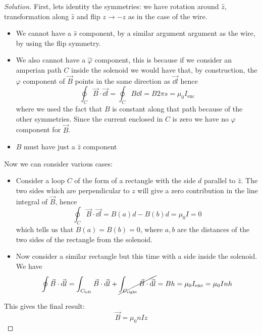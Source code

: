 \documentclass[12pt]{extarticle}
\begin{document}
\begin{proof}[Solution]
    First, lets identity the symmetries:
    we have rotation around $\hat z$, transformation along $\hat z$ and flip $z \to -z$ as in the case of the wire.

    \begin{itemize}
        \item We cannot have a $\hat s$ component, by a similar argument argument as the wire, by using the flip symmetry.
        \item We also cannot have a $\hat \varphi$ component, this is because if we consider an amperian path $C$
              inside the solenoid we would have that, by construction, the $\varphi$ component of $\vec B$ points in the same direction
              as $\vec{\dd l}$ hence
              \begin{equation}
                  \oint_C \vec B \cdot \vec{\dd l} = \oint_C B \dd{l} = B 2\pi s = \mu_0 I_\text{enc}
              \end{equation}
              where we used the fact that $B$ is constant along that path because of the other symmetries.
              Since the current enclosed in $C$ is zero we have no $\varphi$ component for $\vec B$.
        \item $B$ must have just a $\hat z$ component
    \end{itemize}

    Now we can consider various cases:
    \begin{itemize}
        \item Consider a loop $C$ of the form of a rectangle with the side $d$ parallel to $\hat z$.
              The two sides which are perpendicular to $z$ will give a zero contribution in the line integral of $\vec B$,
              hence
              \begin{equation}
                  \oint_C \vec B \cdot \vec{\dd l} = B(a) d - B(b) d = \mu_0 I = 0
              \end{equation}
              which tells us that $B(a) = B(b) = 0$, where $a, b$ are the distances of the two sides of the rectangle from the solenoid.

        \item Now consider a similar rectangle but this time with a side inside the solenoid.
              We have
              \begin{equation}
                  \oint \vec B \cdot \vec{\dd l} = \int_{C_\text{left}} \vec B \cdot \vec{\dd l} +\cancel{\int_{C_\text{right}} \vec B \cdot \vec{\dd l}} = B h = \mu_0 I_\text{enc} = \mu_0 I n h
              \end{equation}
    \end{itemize}

    This gives the final result:
    \begin{equation}
        \vec B = \mu_0 n I \hat z
    \end{equation}
\end{proof}
\end{document}
